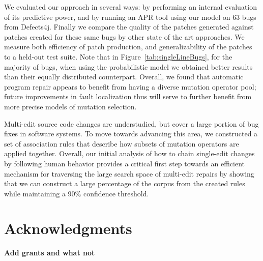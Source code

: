 \documentclass[conference]{IEEEtran}
\newcommand{\todo}[1]
  {{\scriptsize \textbf{\color{red} {#1}}}}
\begin{document}
We evaluated our approach in several ways: by performing an internal 
evaluation of 
its predictive power, and by
 running an APR tool using our model on 63 bugs from
Defects4j. Finally we compare the quality of the patches 
generated against patches created for these same bugs by other state of the art 
approaches. We measure both efficiency of patch production, and generalizability
of the patches to a held-out test suite.  
Note that in Figure~\ref{tab:singleLineBugs}, for the majority of bugs, when using the probabilistic
model we obtained better results than their equally distributed 
counterpart.
Overall, we found that automatic program repair appears to benefit
from having a diverse mutation operator pool; future improvements in fault localization thus will
serve to further benefit from more precise models of mutation selection. 

Multi-edit source code changes are understudied, but cover
a large portion of bug fixes in software systems. 
To move towards advancing this area, we constructed a set of association rules 
that describe 
how subsets of mutation operators are applied together.
%
Overall, our initial analysis of how to chain single-edit changes by following
human behavior provides a critical
first step towards an efficient mechanism for traversing the large search space
of multi-edit repairs by showing that we can construct a large percentage of the corpus from the created rules while maintaining a 90\% confidence threshold.






\section*{Acknowledgments}
\todo{Add grants and what not}






%
%
%







\end{document}
